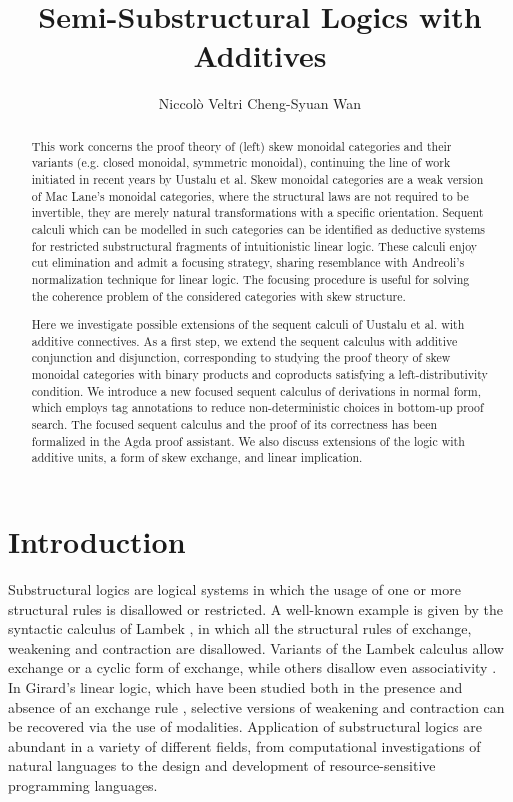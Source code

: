 \documentclass[submission,copyright,creativecommons]{eptcs}
\title{Semi-Substructural Logics with Additives}
\author{
Niccol{\`o} Veltri \qquad\qquad Cheng-Syuan Wan
\institute{Tallinn University of Technology, Estonia}
\email{\quad niccolo@cs.ioc.ee \quad\qquad cswan@cs.ioc.ee}
}
\theoremstyle{definition}
\begin{document}
\maketitle
\begin{abstract}
This work concerns the proof theory of (left) skew monoidal categories and their variants (e.g. closed monoidal, symmetric monoidal), continuing the line of work initiated in recent years by Uustalu et al.
Skew monoidal categories are a weak version of Mac Lane's monoidal categories, where the structural laws are not required to be invertible, they are merely natural transformations with a specific orientation. 
Sequent calculi which can be modelled in such categories can be identified as deductive systems for restricted substructural fragments of intuitionistic linear logic. These calculi enjoy cut elimination and admit a focusing strategy, sharing resemblance with Andreoli's normalization technique for linear logic. The focusing procedure is useful for solving the coherence problem of the considered categories with skew structure.

Here we investigate possible extensions of the sequent calculi of Uustalu et al. with additive connectives. 
As a first step, we extend the sequent calculus with additive conjunction and disjunction, corresponding to studying the proof theory of skew monoidal categories with binary products and coproducts satisfying a left-distributivity condition. 
We introduce a new focused sequent calculus of derivations in normal form, which employs tag annotations to reduce non-deterministic choices in bottom-up proof search.
The focused sequent calculus and the proof of its correctness has been formalized in the Agda proof assistant.
We also discuss extensions of the logic with additive units, a form of skew exchange, and linear implication.
\end{abstract}

\section{Introduction}

Substructural logics are logical systems in which the usage of one or more structural rules is disallowed or restricted. A well-known example is given by the syntactic calculus of Lambek \cite{lambek:mathematics:58}, in which all the structural rules of exchange, weakening and contraction are disallowed. Variants of the Lambek calculus allow exchange or a cyclic form of exchange, while others disallow even associativity \cite{moot:logic:12}. In Girard's linear logic, which have been studied both in the presence and absence of an exchange rule \cite{girard:linear:87,abrusci:noncommutative:1990}, selective versions of weakening and contraction can be recovered via the use of modalities. Application of substructural logics are abundant in a variety of different fields, from computational investigations of natural languages to the design and development of resource-sensitive programming languages.
\end{document}
